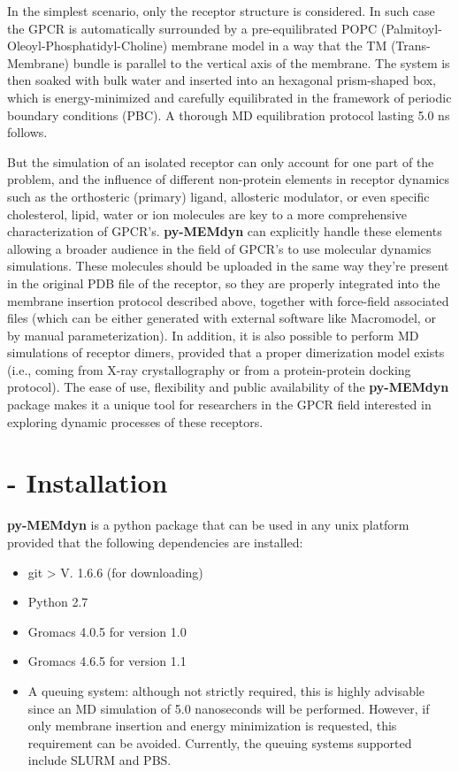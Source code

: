 \documentclass[10pt, oneside, pdftex]{article}
\begin{document}
In   the   simplest  scenario,   only   the   receptor  structure   is
considered. In  such case  the GPCR is  automatically surrounded  by a
pre-equilibrated POPC (Palmitoyl-Oleoyl-Phosphatidyl-Choline) membrane
model in a way that the  TM (Trans-Membrane) bundle is parallel to the
vertical axis  of the  membrane. The system  is then soaked  with bulk
water  and  inserted into  an  hexagonal  prism-shaped  box, which  is
energy-minimized  and  carefully  equilibrated  in  the  framework  of
periodic  boundary  conditions  (PBC).  A  thorough  MD  equilibration
protocol lasting 5.0 ns follows.

But the  simulation of an isolated  receptor can only  account for one
part  of  the problem,  and  the  influence  of different  non-protein
elements  in  receptor  dynamics  such as  the  orthosteric  (primary)
ligand,  allosteric modulator,  or even  specific  cholesterol, lipid,
water   or  ion   molecules   are  key   to   a  more   comprehensive
characterization of GPCR's.   \textbf{py-MEMdyn} can explicitly handle
these elements allowing  a broader audience in the  field of GPCR's to
use molecular dynamics simulations. These molecules should be uploaded
in  the same  way they're  present  in the  original PDB  file of  the
receptor, so they are  properly integrated into the membrane insertion
protocol described  above, together with  force-field associated files
(which can be either generated with external software like Macromodel,
or by manual  parameterization).  In addition, it is  also possible to
perform  MD simulations  of receptor  dimers, provided  that  a proper
dimerization model exists (i.e.,  coming from X-ray crystallography or
from  a   protein-protein  docking   protocol).   The  ease   of  use,
flexibility and public  availability of the \textbf{py-MEMdyn} package
makes it a unique tool for researchers in the GPCR field interested in
exploring dynamic processes of these receptors.

\section*{ - Installation}
\textbf{py-MEMdyn} is a python package that can be used in  any unix
platform provided that the following dependencies are installed:
\begin{itemize}\itemsep0em
\item {git > V. 1.6.6 (for downloading)}
\item {Python 2.7}
\item {Gromacs 4.0.5 for version 1.0}
\item {Gromacs 4.6.5 for version 1.1}
\item  {A queuing  system:  although not  strictly  required, this  is
  highly advisable since  an MD simulation of 5.0  nanoseconds will be
  performed.   However,  if   only  membrane   insertion   and  energy
  minimization    is    requested,    this    requirement    can    be
  avoided. Currently, the queuing  systems supported include SLURM and
  PBS.}
\end{itemize}
\end{document}
